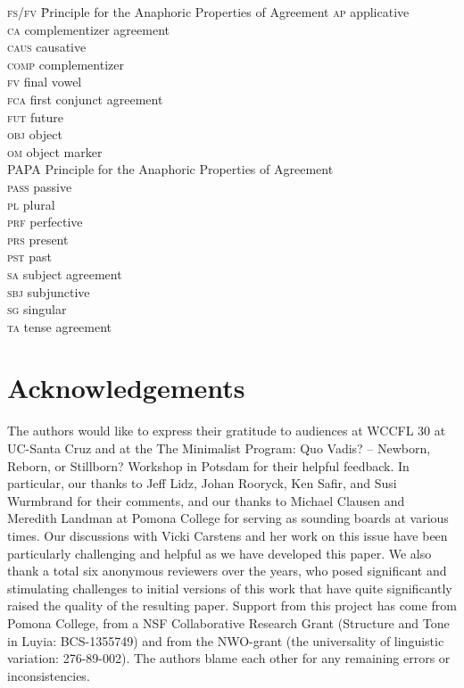 \documentclass[output=paper
,modfonts
,nonflat
]{langsci/langscibook}
\begin{document}
\begin{multicols}{2}
	\begin{tabbing}
		\textsc{fs/fv}\hspace{5mm} \= Principle for the Anaphoric Properties of Agreement\kill
\textsc{ap} \> applicative \\ 
\textsc{ca} \> complementizer agreement \\ 
\textsc{caus} \> causative \\ 
\textsc{comp} \> complementizer \\
\textsc{fv} \> final vowel \\ 
\textsc{fca} \> first conjunct agreement \\
\textsc{fut} \> future \\
\textsc{obj} \> object \\
\textsc{om} \> object marker \\
PAPA \> Principle for the Anaphoric Properties of Agreement \\
\textsc{pass} \> passive \\
\textsc{pl} \> plural \\
\textsc{prf} \> perfective \\ 
\textsc{prs} \> present \\ 
\textsc{pst} \> past \\ 
\textsc{sa} \> subject agreement \\ 
\textsc{sbj} \> subjunctive \\
\textsc{sg} \> singular \\
\textsc{ta} \> tense agreement \\
\end{tabbing}
\end{multicols}

\section*{Acknowledgements}
The authors would like to express their gratitude to audiences at WCCFL 30 at UC-Santa Cruz and at the The Minimalist Program: Quo Vadis? – Newborn, Reborn, or Stillborn? Workshop in Potsdam for their helpful feedback. In particular, our thanks to Jeff Lidz, Johan Rooryck, Ken Safir, and Susi Wurmbrand for their comments, and our thanks to Michael Clausen and Meredith Landman at Pomona College for serving as sounding boards at various times. Our discussions with Vicki Carstens and her work on this issue have been particularly challenging and helpful as we have developed this paper. We also thank a total six anonymous reviewers over the years, who posed significant and stimulating challenges to initial versions of this work that have quite significantly raised the quality of the resulting paper. Support from this project has come from Pomona College, from a NSF Collaborative Research Grant (Structure and Tone in Luyia: BCS-1355749) and from the NWO-grant (the universality of linguistic variation: 276-89-002). The authors blame each other for any remaining errors or inconsistencies.



\sloppy
\printbibliography[heading=subbibliography,notkeyword=this]
\end{document}
